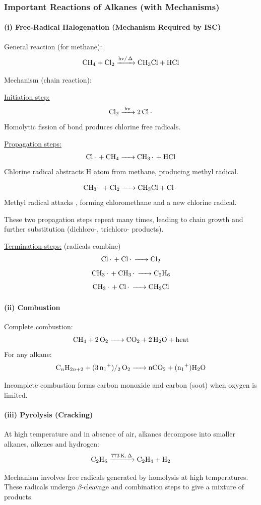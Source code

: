 \documentclass[12pt,a4paper]{article}
\begin{document}
\subsubsection{Important Reactions of Alkanes (with Mechanisms)}

\paragraph{(i) Free-Radical Halogenation (Mechanism Required by ISC)}

General reaction (for methane):
\[
\ce{CH4 + Cl2 ->[hv/ \Delta] CH3Cl + HCl}
\]

Mechanism (chain reaction):

\underline{Initiation step:}
\[
\ce{Cl2 ->[hv] 2Cl.}
\]
Homolytic fission of  bond produces chlorine free radicals.

\underline{Propagation steps:}
\[
\ce{Cl. + CH4 -> CH3. + HCl}
\]
Chlorine radical abstracts H atom from methane, producing methyl radical.

\[
\ce{CH3. + Cl2 -> CH3Cl + Cl.}
\]
Methyl radical attacks , forming chloromethane and a new chlorine radical.  

These two propagation steps repeat many times, leading to chain growth and further substitution (dichloro-, trichloro- products).

\underline{Termination steps:} (radicals combine)
\[
\ce{Cl. + Cl. -> Cl2}
\]
\[
\ce{CH3. + CH3. -> C2H6}
\]
\[
\ce{CH3. + Cl. -> CH3Cl}
\]

\paragraph{(ii) Combustion}
Complete combustion:
\[
\ce{CH4 + 2O2 -> CO2 + 2H2O + \text{heat}}
\]
For any alkane:
\[
\ce{C_nH_{2n+2} + (3n+1)/2 O2 -> nCO2 + (n+1)H2O}
\]

Incomplete combustion forms carbon monoxide and carbon (soot) when oxygen is limited.

\paragraph{(iii) Pyrolysis (Cracking)}
At high temperature and in absence of air, alkanes decompose into smaller alkanes, alkenes and hydrogen:
\[
\ce{C2H6 ->[773K, \Delta] C2H4 + H2}
\]

Mechanism involves free radicals generated by homolysis at high temperatures. These radicals undergo $\beta$-cleavage and combination steps to give a mixture of products.
\end{document}
